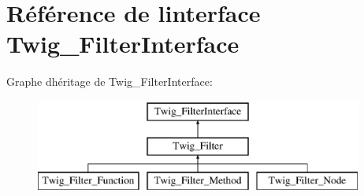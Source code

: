 \hypertarget{interface_twig___filter_interface}{}\section{Référence de l\textquotesingle{}interface Twig\+\_\+\+Filter\+Interface}
\label{interface_twig___filter_interface}
Graphe d\textquotesingle{}héritage de Twig\+\_\+\+Filter\+Interface\+:\begin{figure}[H]
\begin{center}
\leavevmode
\includegraphics[height=3.000000cm]{interface_twig___filter_interface}
\end{center}
\end{figure}
